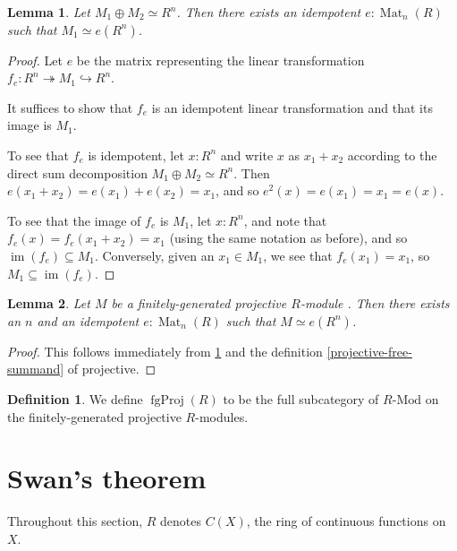 \documentclass[11pt]{article}
\newcommand{\Mat}{\operatorname{Mat}}
\newcommand{\fgProj}{\operatorname{fgProj}}
\newcommand{\im}{\operatorname{im}}
\theoremstyle{plain}
\newtheorem{lemma}{Lemma}[section]
\theoremstyle{definition}
\newtheorem{definition}{Definition}[section]
\begin{document}
\begin{lemma} \label{lemma:fg-projective-idempotent-aux}
  Let \(M_1 \oplus M_2 \simeq R^n\). Then there exists an idempotent \(e : \Mat_n(R)\) such that \(M_1 \simeq e(R^n)\).
\end{lemma}

\begin{proof}
  Let \(e\) be the matrix representing the linear transformation \(f_e : R^n \twoheadrightarrow M_1 \hookrightarrow R^n\).

  It suffices to show that \(f_e\) is an idempotent linear transformation and that its image is \(M_1\).

  To see that \(f_e\) is idempotent, let \(x : R^n\) and write \(x\) as \(x_1 + x_2\) according to the direct sum decomposition \(M_1 \oplus M_2 \simeq R^n\). Then \(e(x_1 + x_2) = e(x_1) + e(x_2) = x_1\), and so \(e^2(x) = e(x_1) = x_1 = e(x)\).

  To see that the image of \(f_e\) is \(M_1\), let \(x : R^n\), and note that \(f_e(x) = f_e(x_1 + x_2) = x_1\) (using the same notation as before), and so \(\im(f_e) \subseteq M_1\). Conversely, given an \(x_1 \in M_1\), we see that \(f_e(x_1) = x_1\), so \(M_1 \subseteq \im(f_e)\).
\end{proof}

\begin{lemma} \label{lemma:fg-projective-idempotent}
  Let \(M\) be a finitely-generated projective \(R\)-module . Then there exists an \(n\) and an idempotent \(e : \Mat_n(R)\) such that \(M \simeq e(R^n)\).
\end{lemma}

\begin{proof}
  This follows immediately from \ref{lemma:fg-projective-idempotent-aux} and the definition \ref{projective-free-summand} of projective.
\end{proof}

\begin{definition} \label{def:category-projective-modules}
  We define \(\fgProj(R)\) to be the full subcategory of \(R\text{-Mod}\) on the finitely-generated projective \(R\)-modules.
\end{definition}

\section{Swan's theorem}

Throughout this section, \(R\) denotes \(C(X)\), the ring of continuous functions on \(X\).
\end{document}
